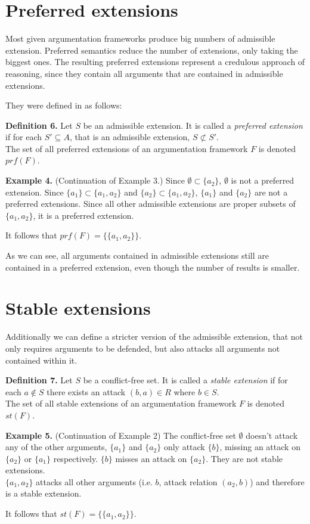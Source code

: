 \documentclass[draft,final]{vutinfth} %
\newcommand{\hl}{\par\vspace{6pt}} %
\newcommand{\cl}{\par\vspace{12pt}} %
\begin{document}
\section{Preferred extensions}

Most given argumentation frameworks produce big numbers of admissible extension. Preferred semantics reduce the number of extensions, only taking the biggest ones. The resulting preferred extensions represent a credulous approach of reasoning, since they contain all arguments that are contained in admissible extensions.\hl
They were defined in \cite{Egly} as follows:\cl

\textbf{Definition 6.} Let $S$ be an admissible extension. It is called a \emph{preferred extension} if for each $S'\subseteq A$, that is an admissible extension, $S\not\subset S'$.\\
The set of all preferred extensions of an argumentation framework $F$ is denoted $prf(F)$.\cl

\textbf{Example 4.} (Continuation of Example 3.) Since $\emptyset\subset\{a_2\}$, \(\emptyset\) is not a preferred extension. Since $\{a_1\}\subset\{a_1,a_2\}$ and $\{a_2\}\subset\{a_1,a_2\}$, $\{a_1\}$ and $\{a_2\}$ are not a preferred extensions. Since all other admissible extensions are proper subsets of $\{a_1,a_2\}$, it is a preferred extension.\hl
It follows that $prf(F)=\{\{a_1,a_2\}\}$.\hl
As we can see, all arguments contained in admissible extensions still are contained in a preferred extension, even though the number of results is smaller.\cl

\section{Stable extensions}

Additionally we can define a stricter version of the admissible extension, that not only requires arguments to be defended, but also attacks all arguments not contained within it.\cl

\textbf{Definition 7.} Let $S$ be a conflict-free set. It is called a \emph{stable extension} if for each $a\not\in S$ there exists an attack $(b,a)\in R$ where $b\in S$.\\
The set of all stable extensions of an argumentation framework $F$ is denoted $st(F)$.\cl

\textbf{Example 5.} (Continuation of Example 2) The conflict-free set $\emptyset$ doesn't attack any of the other arguments, $\{a_1\}$ and $\{a_2\}$ only attack $\{b\}$, missing an attack on $\{a_2\}$ or $\{a_1\}$ respectively. $\{b\}$ misses an attack on $\{a_2\}$. They are not stable extensions.\\
$\{a_1,a_2\}$ attacks all other arguments (i.e. $b$, attack relation $(a_2,b)$) and therefore is a stable extension.\hl
It follows that $st(F)=\{\{a_1,a_2\}\}$.\cl
\end{document}
